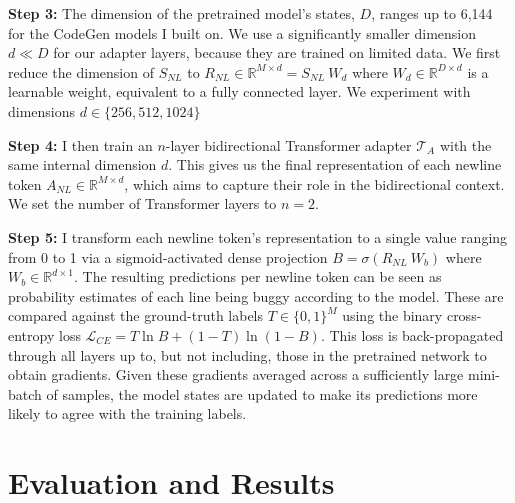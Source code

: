 \documentclass[12pt,openany,oneside,table]{cmuthesis}
\begin{document}
\textbf{Step 3:} The dimension of the pretrained model's states, $D$, ranges up to 6,144 for the CodeGen models I built on. We use a significantly smaller dimension $d \ll D$ for our adapter layers, because they are trained on limited data. We first reduce the dimension of $S_{NL}$ to $R_{NL} \in \mathbb{R}^{M \times d} = S_{NL} ~ W_d$ where $W_d \in \mathbb{R}^{D \times d}$ is a learnable weight, equivalent to a fully connected layer. We experiment with dimensions $d \in \{256, 512, 1024\}$

\textbf{Step 4:} I then train an $n$-layer bidirectional Transformer adapter $\mathcal{T}_{A}$ with the same internal dimension $d$. This gives us the final representation of each newline token $A_{NL} \in \mathbb{R}^{M \times d}$, which aims to capture their role in the bidirectional context. We set the number of Transformer layers to $n = 2$.

\textbf{Step 5:} I transform each newline token's representation to a single value ranging from 0 to 1 via a sigmoid-activated dense projection $B = \sigma(R_{NL} ~ W_b)$ where $W_b \in \mathbb{R}^{d \times 1}$. The resulting predictions per newline token can be seen as probability estimates of each line being buggy according to the model. These are compared against the ground-truth labels $T \in \{0, 1\}^M$ using the binary cross-entropy loss $\mathcal{L}_{CE} = T \ln{B} + (1 - T) \ln{(1-B)}$. This loss is back-propagated through all layers up to, but not including, those in the pretrained network to obtain gradients. Given these gradients averaged across a sufficiently large mini-batch of samples, the model states are updated to make its predictions more likely to agree with the training labels.

\section{Evaluation and Results}
\end{document}
